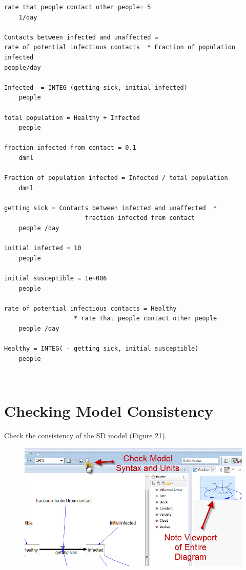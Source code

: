\documentclass[11pt]{amsart}
\begin{document}
\begin{verbatim}
rate that people contact other people= 5
	1/day
	
Contacts between infected and unaffected = 
rate of potential infectious contacts  * Fraction of population infected
people/day

Infected  = INTEG (getting sick, initial infected)
	people

total population = Healthy + Infected
	people

fraction infected from contact = 0.1
	dmnl

Fraction of population infected = Infected / total population
	dmnl

getting sick = Contacts between infected and unaffected  * 
                      fraction infected from contact
	people /day

initial infected = 10
	people

initial susceptible = 1e+006
	people	

rate of potential infectious contacts = Healthy  
                   * rate that people contact other people
	people /day

Healthy = INTEG( - getting sick, initial susceptible)
	people
\end{verbatim}
 
\clearpage

\section{Checking Model Consistency}
Check the consistency of the SD model (Figure 21).



\begin{figure}[ht]
\begin{center}
\vspace{.2in}
\centerline {
\includegraphics[totalheight=0.4\textheight]{images/021.jpg}
}
\caption{}
\label{fig:021}
\end{center}
\end{figure}
\end{document}
